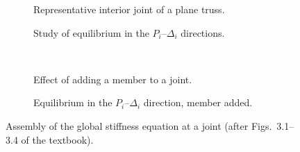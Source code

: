 \begin{figure}[tb]
  \centering
  \begin{subfigure}[b]{0.52\textwidth}\centering
    \caption{Representative interior joint of a plane truss.}\end{subfigure}\hfill
  \begin{subfigure}[b]{0.44\textwidth}\centering
    \caption{Study of equilibrium in the $P_i$--$\Delta_i$ directions.}\end{subfigure}\\[1em]
  \begin{subfigure}[b]{0.52\textwidth}\centering
    \caption{Effect of adding a member to a joint.}\end{subfigure}\hfill
  \begin{subfigure}[b]{0.44\textwidth}\centering
    \caption{Equilibrium in the $P_i$--$\Delta_i$ direction, member added.}\end{subfigure}
  \caption{Assembly of the global stiffness equation at a joint (after Figs.~3.1--3.4 of the textbook).}
  \label{fig:mcguire-joint}
\end{figure}

